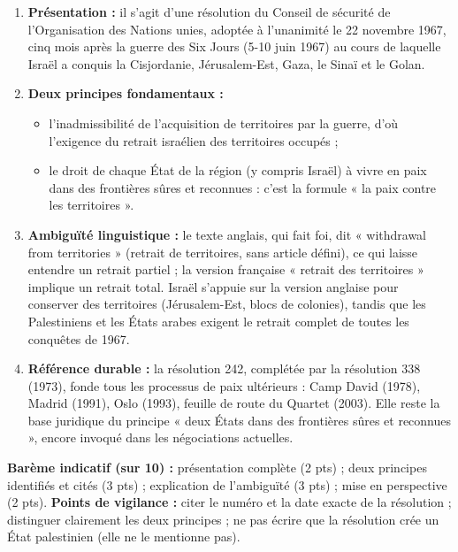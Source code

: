 \documentclass[11pt]{article}
\begin{document}
\begin{corrige}
\begin{enumerate}
    \item \textbf{Présentation :} il s'agit d'une résolution du Conseil de sécurité de l'Organisation des Nations unies, adoptée à l'unanimité le 22 novembre 1967, cinq mois après la guerre des Six Jours (5-10 juin 1967) au cours de laquelle Israël a conquis la Cisjordanie, Jérusalem-Est, Gaza, le Sinaï et le Golan.
    \item \textbf{Deux principes fondamentaux :}
    \begin{itemize}
        \item l'inadmissibilité de l'acquisition de territoires par la guerre, d'où l'exigence du retrait israélien des territoires occupés ;
        \item le droit de chaque État de la région (y compris Israël) à vivre en paix dans des frontières sûres et reconnues : c'est la formule « la paix contre les territoires ».
    \end{itemize}
    \item \textbf{Ambiguïté linguistique :} le texte anglais, qui fait foi, dit « withdrawal from territories » (retrait de territoires, sans article défini), ce qui laisse entendre un retrait partiel ; la version française « retrait des territoires » implique un retrait total. Israël s'appuie sur la version anglaise pour conserver des territoires (Jérusalem-Est, blocs de colonies), tandis que les Palestiniens et les États arabes exigent le retrait complet de toutes les conquêtes de 1967.
    \item \textbf{Référence durable :} la résolution 242, complétée par la résolution 338 (1973), fonde tous les processus de paix ultérieurs : Camp David (1978), Madrid (1991), Oslo (1993), feuille de route du Quartet (2003). Elle reste la base juridique du principe « deux États dans des frontières sûres et reconnues », encore invoqué dans les négociations actuelles.
\end{enumerate}
\textbf{Barème indicatif (sur 10) :} présentation complète (2 pts) ; deux principes identifiés et cités (3 pts) ; explication de l'ambiguïté (3 pts) ; mise en perspective (2 pts).
\textbf{Points de vigilance :} citer le numéro et la date exacte de la résolution ; distinguer clairement les deux principes ; ne pas écrire que la résolution crée un État palestinien (elle ne le mentionne pas).
\end{corrige}
\end{document}
